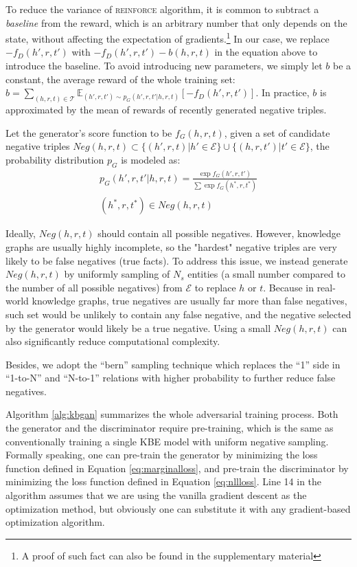 \documentclass[11pt,a4paper]{article}
\begin{document}
To reduce the variance of \textsc{reinforce} algorithm, it is common to subtract a \emph{baseline} from the reward, which is an arbitrary number that only depends on the state, without affecting the expectation of gradients.\footnote{A proof of such fact can also be found in the supplementary material} In our case, we replace $-f_D(h',r,t')$ with $-f_D(h',r,t')-b(h,r,t)$ in the equation above to introduce the baseline. To avoid introducing new parameters, we simply let $b$ be a constant, the average reward of the whole training set: $b=\sum_{(h,r,t)\in\mathcal{T}}\mathbb{E}_{(h',r,t')\sim p_G(h',r,t'|h,r,t)}[-f_D(h',r,t')]$. In practice, $b$ is approximated by the mean of rewards of recently generated negative triples.

Let the generator's score function to be $f_G(h,r,t)$, given a set of candidate negative triples $Neg(h,r,t)\subset\{(h',r,t)|h'\in\mathcal{E}\}\cup\{(h,r,t')|t'\in\mathcal{E}\}$, the probability distribution $p_G$ is modeled as:
\begin{multline}
p_G(h',r,t'|h,r,t)=\frac{\exp f_G(h',r,t')}{\sum\exp f_G(h^*,r,t^*)} \\
(h^*,r,t^*)\in Neg(h,r,t)
\end{multline}

Ideally, $Neg(h,r,t)$ should contain all possible negatives. However, knowledge graphs are usually highly incomplete, so the "hardest" negative triples are very likely to be false negatives (true facts). To address this issue, we instead generate $Neg(h,r,t)$ by uniformly sampling of $N_s$ entities (a small number compared to the number of all possible negatives) from $\mathcal{E}$ to replace $h$ or $t$. Because in real-world knowledge graphs, true negatives are usually far more than false negatives, such set would be unlikely to contain any false negative, and the negative selected by the generator would likely be a true negative. Using a small $Neg(h,r,t)$ can also significantly reduce computational complexity.

Besides, we adopt the ``bern'' sampling technique \cite{wang2014knowledge} which replaces the ``1'' side in ``1-to-N'' and ``N-to-1'' relations with higher probability to further reduce false negatives.

Algorithm \ref{alg:kbgan} summarizes the whole adversarial training process. Both the generator and the discriminator require pre-training, which is the same as conventionally training a single KBE model with uniform negative sampling. Formally speaking, one can pre-train the generator by minimizing the loss function defined in Equation \eqref{eq:marginalloss}, and pre-train the discriminator by minimizing the loss function defined in Equation \eqref{eq:nllloss}. Line 14 in the algorithm assumes that we are using the vanilla gradient descent as the optimization method, but obviously one can substitute it with any gradient-based optimization algorithm.
\end{document}
